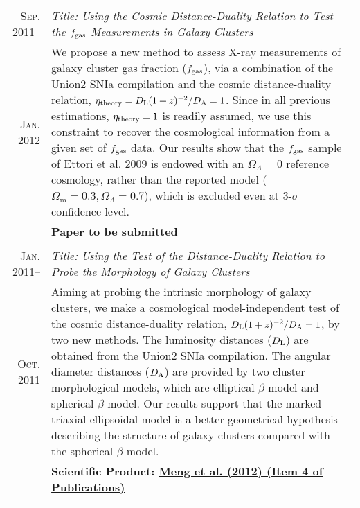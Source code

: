\documentclass[10pt]{article}
\begin{document}
\begin{longtable}{r|p{17cm}}
\textsc{Sep. 2011}--     &   \emph{Title: Using the Cosmic Distance-Duality Relation to Test the $f_{\rm gas}$ Measurements in Galaxy Clusters} \\
\textsc{Jan. 2012}  &   \small{We propose a new method to assess X-ray measurements of galaxy cluster gas fraction ($f_{\rm gas}$), via a combination of the Union2 SNIa compilation and the cosmic distance-duality relation, $\eta_{\rm{theory}}=D_{\rm L}(1+z)^{-2}/D_{\rm A}=1$. Since in all previous estimations, $\eta_{\rm{theory}}=1$ is readily assumed, we use this constraint to recover the cosmological information from a given set of $f_{\rm gas}$ data. Our results show that the $f_{\rm gas}$ sample of Ettori et al. 2009 is endowed with an $\Omega_{\Lambda}=0$ reference cosmology, rather than the reported model ($\Omega_\textrm{m}=0.3,\Omega_{\Lambda}=0.7$), which is excluded even at 3-$\sigma$ confidence level.}\\
&   \textbf{Paper to be submitted}\\
\multicolumn{2}{c}{} \\

\textsc{Jan. 2011}--     &   \emph{Title: Using the Test of the Distance-Duality Relation to Probe the Morphology of Galaxy Clusters} \\
\textsc{Oct. 2011}       &   \small{Aiming at probing the intrinsic morphology of galaxy clusters, we make a cosmological model-independent test of the cosmic distance-duality relation, $D_{\rm L}(1+z)^{-2}/D_{\rm A}=1$, by two new methods. The luminosity distances ($D_{\rm L}$) are obtained from the Union2 SNIa compilation. The angular diameter distances ($D_{\rm A}$) are provided by two cluster morphological models, which are elliptical $\beta$-model and spherical $\beta$-model. Our results support that the marked triaxial ellipsoidal model is a better geometrical hypothesis describing the structure of galaxy clusters compared with the spherical $\beta$-model.}    \\
                &   \textbf{Scientific Product: \hyperlink{4}{Meng et al. (2012) (Item 4 of Publications)}} \\
\multicolumn{2}{c}{} \\


\end{longtable}
\end{document}
